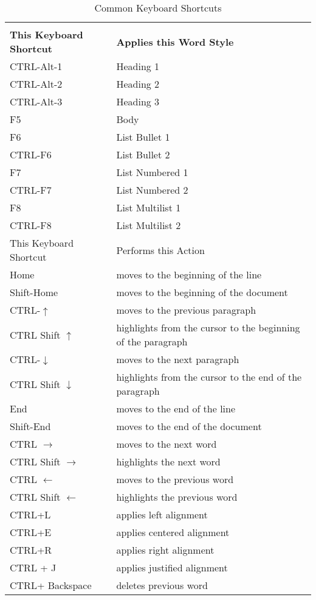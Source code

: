 \begin{center}
\begin{longtable}{ll}
\caption{Common Keyboard Shortcuts}{} \label{table1} \\
\textbf{This Keyboard Shortcut} & \textbf{Applies this Word Style} \\
CTRL-Alt-1 & Heading 1 \\
CTRL-Alt-2 & Heading 2 \\
CTRL-Alt-3 & Heading 3 \\
F5 & Body \\
F6 & List Bullet 1 \\
CTRL-F6 & List Bullet 2 \\
F7 & List Numbered 1 \\
CTRL-F7 & List Numbered 2 \\
F8 & List Multilist 1 \\
CTRL-F8 & List Multilist 2 \\
This Keyboard Shortcut & Performs this Action \\
Home & moves to the beginning of the line \\
Shift-Home & moves to the beginning of the document \\
CTRL-$\uparrow$ & moves to the previous paragraph \\
CTRL Shift $\uparrow$ & highlights from the cursor to the beginning of the paragraph \\
CTRL-$\downarrow$ & moves to the next paragraph \\
CTRL Shift $\downarrow$ & highlights from the cursor to the end of the paragraph \\
End & moves to the end of the line \\
Shift-End & moves to the end of the document \\
CTRL $\rightarrow$ & moves to the next word \\
CTRL Shift $\rightarrow$ & highlights the next word \\
CTRL $\leftarrow$ & moves to the previous word \\
CTRL Shift $\leftarrow$ & highlights the previous word \\
CTRL+L & applies left alignment \\
CTRL+E & applies centered alignment \\
CTRL+R & applies right alignment \\
CTRL + J & applies justified alignment \\
CTRL+ Backspace & deletes previous word \\

\end{longtable}
\end{center}
